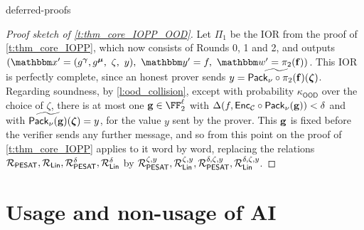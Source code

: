 \begin{lncsappendix}{deferred-proofs}
\begin{proof}[Proof sketch of \cref{t:thm_core_IOPP_OOD}]
Let $\Pi_1$ be the IOR from the proof of \cref{t:thm_core_IOPP}, which now consists of Rounds 0, 1 and 2, and outputs $\left(\inp'=(g^{\bm{\gamma}}, g^{\bm{\mu}},\ \zeta,\ y),\ \oracle'= f, \ \wit'=\picomfield(\bff)\right)$. This IOR is perfectly complete, since an honest prover sends $y={\widetilde{\mathsf{Pack}_\nu\circ\pi_2(\mathbf{f})}}(\bm{\zeta})$. Regarding soundness, by \cref{l:ood_collision}, except with probability $\kappa_{\mathsf{OOD}}$ over the choice of $\zeta$, there is at most one $\bfg\in \FF_2^{\codedim}$ with $\Delta(f,\mathsf{Enc}_{\mathcal{C}}\circ\mathsf{Pack}_\nu(\mathbf{g}))<\delta$ and with ${\widetilde{\mathsf{Pack}_\nu(\mathbf{g})}}(\bm{\zeta})=y$, for the value $y$ sent by the prover. This $\mathbf{g}$ is fixed before the verifier sends any further message, and so from this point on the proof of \cref{t:thm_core_IOPP} applies to it word by word, replacing the relations $\mathcal{R}_{\mathsf{PESAT}}, \mathcal{R}_{\mathsf{Lin}}, \mathcal{R}_{\mathsf{PESAT}}^\delta, \mathcal{R}_{\mathsf{Lin}}^\delta$ by $\mathcal{R}_{\mathsf{PESAT}}^{\zeta,y}, \mathcal{R}_{\mathsf{Lin}}^{\zeta,y}, \mathcal{R}_{\mathsf{PESAT}}^{\delta,\zeta,y}, \mathcal{R}_{\mathsf{Lin}}^{\delta,\zeta,y}$.
\end{proof}
\end{lncsappendix}






\iflncs
\section{Usage and non-usage of AI}\label{s:ai_usage}
\fi
{}
